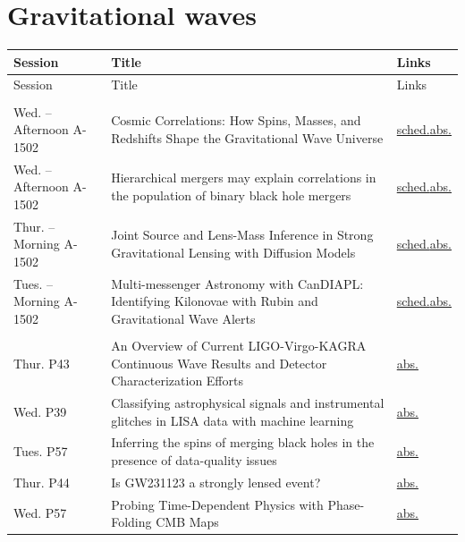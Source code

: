 \section*{Gravitational waves}
{\small
\setlength{\emergencystretch}{1em}
\begin{longtable}{@{}>{\TableRaggedRight\arraybackslash\hspace{0pt}}p{} >{\TableRaggedRight\arraybackslash\hspace{0pt}}p{} >{\TableRaggedRight\arraybackslash\hspace{0pt}}p{}@{}}
\toprule
Session & Title & Links \\
\midrule
\endfirsthead
\toprule
Session & Title & Links \\
\midrule
\endhead
\addlinespace[0.15em]
\multicolumn{3}{@{}l}{\sffamily\bfseries\color{cascateal} Talks} \\
\addlinespace[0.1em]
Wed. -- Afternoon A-1502 & Cosmic Correlations: How Spins, Masses, and Redshifts Shape the Gravitational Wave Universe & \hyperlink{schedule-talk-307}{sched.}\newline \hyperlink{abstract-talk-307}{abs.} \\
Wed. -- Afternoon A-1502 & Hierarchical mergers may explain correlations in the population of binary black hole mergers & \hyperlink{schedule-talk-262}{sched.}\newline \hyperlink{abstract-talk-262}{abs.} \\
Thur. -- Morning A-1502 & Joint Source and Lens-Mass Inference in Strong Gravitational Lensing with Diffusion Models & \hyperlink{schedule-talk-317}{sched.}\newline \hyperlink{abstract-talk-317}{abs.} \\
Tues. -- Morning A-1502 & Multi-messenger Astronomy with CanDIAPL: Identifying Kilonovae with Rubin and Gravitational Wave Alerts & \hyperlink{schedule-talk-140}{sched.}\newline \hyperlink{abstract-talk-140}{abs.} \\
\addlinespace[0.15em]
\multicolumn{3}{@{}l}{\sffamily\bfseries\color{cascateal} Posters} \\
\addlinespace[0.1em]
Thur. P43 & An Overview of Current LIGO-Virgo-KAGRA Continuous Wave Results and Detector Characterization Efforts & \hyperlink{poster-abstract-talk-249}{abs.} \\
Wed. P39 & Classifying astrophysical signals and instrumental glitches in LISA data with machine learning & \hyperlink{poster-abstract-talk-59}{abs.} \\
Tues. P57 & Inferring the spins of merging black holes in the presence of data-quality issues & \hyperlink{poster-abstract-talk-84}{abs.} \\
Thur. P44 & Is GW231123 a strongly lensed event? & \hyperlink{poster-abstract-talk-296}{abs.} \\
Wed. P57 & Probing Time-Dependent Physics with Phase-Folding CMB Maps & \hyperlink{poster-abstract-talk-44}{abs.} \\
\bottomrule
\end{longtable}
}

